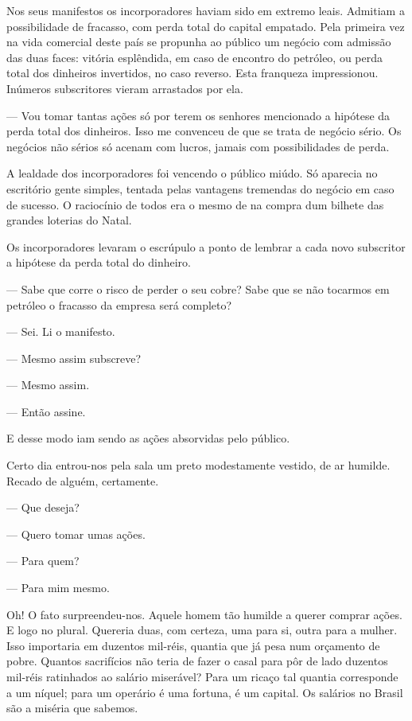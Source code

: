 Nos seus manifestos os incorporadores haviam sido em extremo leais.
Admitiam a possibilidade de fracasso, com perda total do capital
empatado. Pela primeira vez na vida comercial deste país se propunha ao
público um negócio com admissão das duas faces: vitória esplêndida, em
caso de encontro do petróleo, ou perda total dos dinheiros invertidos,
no caso reverso. Esta franqueza impressionou. Inúmeros subscritores
vieram arrastados por ela.

--- Vou tomar tantas ações só por terem os senhores mencionado a
hipótese da perda total dos dinheiros. Isso me convenceu de que se trata
de negócio sério. Os negócios não sérios só acenam com lucros, jamais
com possibilidades de perda.

A lealdade dos incorporadores foi vencendo o público miúdo. Só aparecia
no escritório gente simples, tentada pelas vantagens tremendas do
negócio em caso de sucesso. O raciocínio de todos era o mesmo de na
compra dum bilhete das grandes loterias do Natal.

Os incorporadores levaram o escrúpulo a ponto de lembrar a cada novo
subscritor a hipótese da perda total do dinheiro.

--- Sabe que corre o risco de perder o seu cobre? Sabe que se não
tocarmos em petróleo o fracasso da empresa será completo?

--- Sei. Li o manifesto.

--- Mesmo assim subscreve?

--- Mesmo assim.

--- Então assine.

E desse modo iam sendo as ações absorvidas pelo público.

Certo dia entrou-nos pela sala um preto modestamente vestido, de ar
humilde. Recado de alguém, certamente.

--- Que deseja?

--- Quero tomar umas ações.

--- Para quem?

--- Para mim mesmo.

Oh! O fato surpreendeu-nos. Aquele homem tão humilde a querer comprar
ações. E logo no plural. Quereria duas, com certeza, uma para si, outra
para a mulher. Isso importaria em duzentos mil-réis, quantia que já pesa
num orçamento de pobre. Quantos sacrifícios não teria de fazer o casal
para pôr de lado duzentos mil-réis ratinhados ao salário miserável? Para
um ricaço tal quantia corresponde a um níquel; para um operário é uma
fortuna, é um capital. Os salários no Brasil são a miséria que sabemos.

